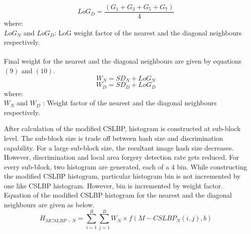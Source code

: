 \documentclass[12pt,a4paper]{jihmsp}
\begin{document}
{{\begin{equation}
LoG_{D}=\frac{(G_{1}+G_{3}+G_{5}+G_{7})}{4}
\end{equation}
where:\\
$LoG_{N}$ and $LoG_{D}$: LoG weight factor of the nearest and the diagonal neighbours respectively. \\
\\
Final weight for the nearest and the diagonal neighbours are given by equations $(9)$ and $(10)$.
\begin{equation}
W_{N}=SD_{N}+LoG_{N}
\end{equation}
\begin{equation}
W_{D}=SD_{D}+LoG_{D}
\end{equation}
where:\\
$W_{N}$ and $W_{D}$ : Weight factor of the nearest and the diagonal neighbours respectively. 
\par
After calculation of the modified CSLBP, histogram is constructed at sub-block level. The sub-block size is trade off between hash size and discrimination capability. For a large sub-block size, the resultant image hash size decreases. However, discrimination and local area forgery detection rate gets reduced. For every sub-block, two histogram are generated, each of a $4$ bin. While constructing the modified CSLBP histogram, particular histogram bin is not incremented by one like CSLBP histogram. However, bin is incremented by weight factor. Equation of the modified CSLBP histogram for the nearest and the diagonal neighbours are given as below.
\begin{equation}
H_{MCSLBP-N}=\sum_{i=1}^B\sum_{j=1}^BW_N \times f(M-CSLBP_{N}(i,j),b)
\end{equation}

}}
\end{document}
